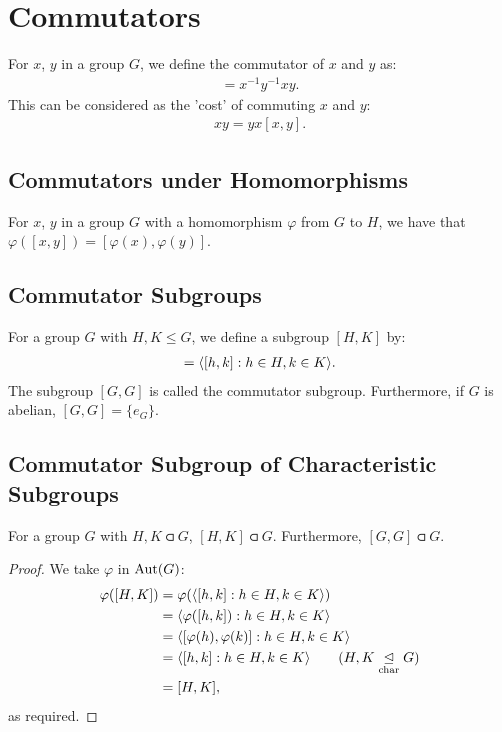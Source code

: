 \section{Commutators} 

For $x$, $y$ in a group $G$, we define the commutator
of $x$ and $y$ as: \begin{align*}
    [x, y] = x^{-1}y^{-1}xy.
\end{align*} This can be considered as the 'cost' of commuting
$x$ and $y$: \begin{align*}
    xy = yx[x, y].
\end{align*} 

\subsection{Commutators under Homomorphisms} \label{2.3}

For $x$, $y$ in a group $G$ with a homomorphism $\varphi$ from $G$ to $H$, 
we have that $\varphi([x, y]) = [\varphi(x), \varphi(y)]$.

\subsection{Commutator Subgroups}

For a group $G$ with $H, K \leq G$, we define a subgroup $[H, K]$ by:
\begin{align*}
    [H, K] = \ang{[h, k] : h \in H, k \in K}.
\end{align*} The subgroup $[G, G]$ is called the commutator subgroup.
Furthermore, if $G$ is abelian, $[G, G] = \{e_G\}$.

\subsection{Commutator Subgroup of Characteristic Subgroups} \label{2.27}

For a group $G$ with $H, K \csub G$, $[H, K] \csub G$. Furthermore,
$[G, G] \csub G$.

\begin{proof}
    We take $\varphi$ in $\operatorname{Aut}(G)$: \begin{align*}
        \varphi([H, K]) 
        &= \varphi(\ang{[h, k] : h \in H, k \in K}) \\
        &= \ang{\varphi([h, k]) : h \in H, k \in K} \\
        &= \ang{[\varphi(h), \varphi(k)] : h \in H, k \in K} \\
        &= \ang{[h, k] : h \in H, k \in K} \tag{$H, K \csub G$} \\
        &= [H, K],
    \end{align*} as required.
\end{proof}


